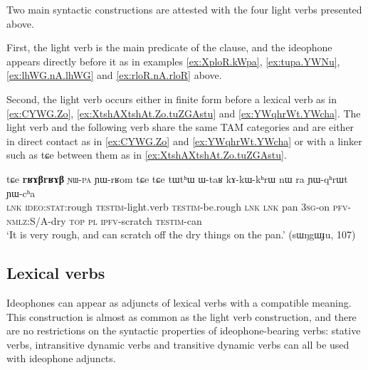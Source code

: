 \documentclass[oldfontcommands,oneside,a4paper,11pt]{article}
\newcommand{\ipa}[1]{{\phon \mbox{#1}}} %
\begin{document}
Two main syntactic constructions are attested with the four light verbs presented above.

First, the light verb is the main predicate of the clause, and the ideophone appears directly before it as in examples \ref{ex:XploR.kWpa}, \ref{ex:tupa.YWNu}, \ref{ex:lhWG.nA.lhWG} and \ref{ex:rloR.nA.rloR} above. 


Second, the light verb occurs either in finite   form before a lexical verb as in \ref{ex:CYWG.Zo}, \ref{ex:XtshAXtshAt.Zo.tuZGAstu}  and \ref{ex:YWqhrWt.YWcha}. The light verb and the following verb share the same TAM categories and are either in direct contact as in \ref{ex:CYWG.Zo} and \ref{ex:YWqhrWt.YWcha} or with a linker such as \ipa{tɕe} between them as in \ref{ex:XtshAXtshAt.Zo.tuZGAstu}.

\begin{exe}
\ex \label{ex:YWqhrWt.YWcha}
\gll
\ipa{tɕe} 	\ipa{\textbf{rʁɤβrʁɤβ}} 	\textsc{\ipa{ɲɯ-pa}} 	\ipa{ɲɯ-rʁom} 	\ipa{tɕe} 	\ipa{tɕe} 	\ipa{tɯtʰɯ} 	\ipa{ɯ-taʁ} 	\ipa{kɤ-kɯ-kʰrɯ} 	\ipa{nɯ} \ipa{ra} 	\ipa{ɲɯ-qʰrɯt} 	\ipa{ɲɯ-cʰa}       \\   
\textsc{lnk} \textsc{ideo:stat}:rough \textsc{testim}-light.verb \textsc{testim}-be.rough \textsc{lnk}  \textsc{lnk} pan \textsc{3sg}-on \textsc{pfv-nmlz}:S/A-dry \textsc{top} \textsc{pl} \textsc{ipfv}-scratch \textsc{testim}-can \\        
\glt  `It is very rough, and can scratch off the dry things on the pan.' (sɯŋgɯɟu, 107) 
\end{exe}





\subsection{Lexical verbs} \label{sec:ideophone.plus.lexical.verb}
Ideophones can appear as adjuncts of   lexical verbs with a compatible meaning. This construction is almost as common as the light verb construction, and there are no restrictions on the syntactic properties of ideophone-bearing verbs: stative verbs, intransitive dynamic verbs and transitive dynamic verbs can all be used with ideophone adjuncts.
\end{document}
